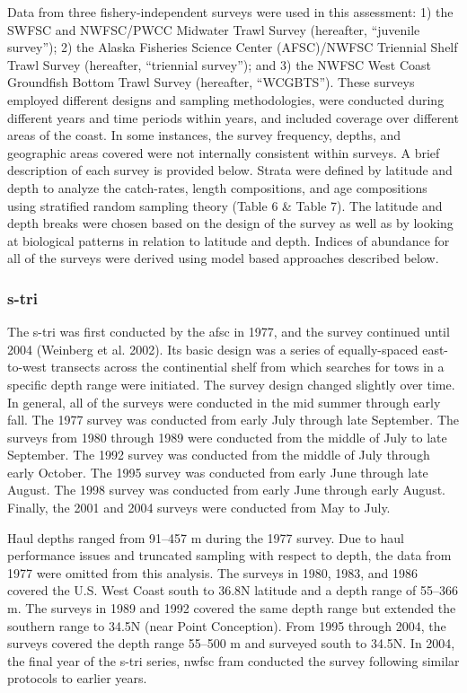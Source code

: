 \documentclass[
]{scrartcl}
\begin{document}
Data from three fishery-independent surveys were used in this
assessment: 1) the SWFSC and NWFSC/PWCC Midwater Trawl Survey
(hereafter, ``juvenile survey''); 2) the Alaska Fisheries Science Center
(AFSC)/NWFSC Triennial Shelf Trawl Survey (hereafter, ``triennial
survey''); and 3) the NWFSC West Coast Groundfish Bottom Trawl Survey
(hereafter, ``WCGBTS''). These surveys employed different designs and
sampling methodologies, were conducted during different years and time
periods within years, and included coverage over different areas of the
coast. In some instances, the survey frequency, depths, and geographic
areas covered were not internally consistent within surveys. A brief
description of each survey is provided below. Strata were defined by
latitude and depth to analyze the catch-rates, length compositions, and
age compositions using stratified random sampling theory (Table 6 \&
Table 7). The latitude and depth breaks were chosen based on the design
of the survey as well as by looking at biological patterns in relation
to latitude and depth. Indices of abundance for all of the surveys were
derived using model based approaches described below.

\subsubsection{\texorpdfstring{\acrlong{s-tri}}{}}\label{section}

The \gls{s-tri} was first conducted by the \gls{afsc} in 1977, and the
survey continued until 2004 (Weinberg et al. 2002). Its basic design was
a series of equally-spaced east-to-west transects across the
continential shelf from which searches for tows in a specific depth
range were initiated. The survey design changed slightly over time. In
general, all of the surveys were conducted in the mid summer through
early fall. The 1977 survey was conducted from early July through late
September. The surveys from 1980 through 1989 were conducted from the
middle of July to late September. The 1992 survey was conducted from the
middle of July through early October. The 1995 survey was conducted from
early June through late August. The 1998 survey was conducted from early
June through early August. Finally, the 2001 and 2004 surveys were
conducted from May to July.

Haul depths ranged from 91--457 m during the 1977 survey. Due to haul
performance issues and truncated sampling with respect to depth, the
data from 1977 were omitted from this analysis. The surveys in 1980,
1983, and 1986 covered the U.S. West Coast south to 36.8\textdegree N
latitude and a depth range of 55--366 m. The surveys in 1989 and 1992
covered the same depth range but extended the southern range to
34.5\textdegree N (near Point Conception). From 1995 through 2004, the
surveys covered the depth range 55--500 m and surveyed south to
34.5\textdegree N. In 2004, the final year of the \gls{s-tri} series,
\gls{nwfsc} \gls{fram} conducted the survey following similar protocols
to earlier years.
\end{document}
